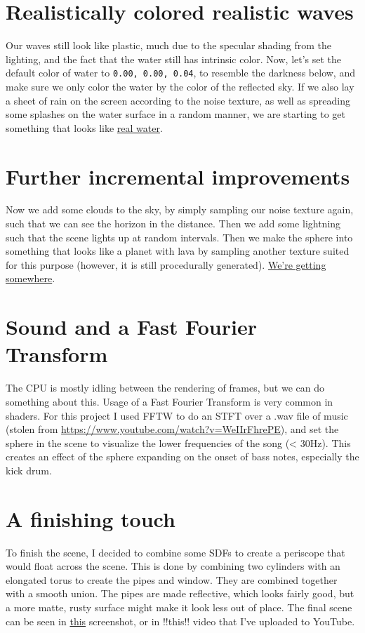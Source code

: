 \documentclass[abstract=off,oneside]{scrreprt}
\begin{document}
\section*{Realistically colored realistic waves}
\label{sec-10}
\label{sec:realisticcolor}
Our waves still look like plastic, much due to the specular shading
from the lighting, and the fact that the water still has intrinsic
color. Now, let's set the default color of water to \verb~0.00, 0.00, 0.04~, to resemble the darkness below, and make sure we only color the
water by the color of the reflected sky. If we also lay a sheet of
rain on the screen according to the noise texture, as well as
spreading some splashes on the water surface in a random manner, we
are starting to get something that looks like \hyperref[fig:okwater]{real water}.

\section*{Further incremental improvements}
\label{sec-11}
\label{sec:furtherimprovements}
Now we add some clouds to the sky, by simply sampling our noise
texture again, such that we can see the horizon in the distance. Then
we add some lightning such that the scene lights up at random
intervals. Then we make the sphere into something that looks like a
planet with lava by sampling another texture suited for this purpose
(however, it is still procedurally generated). \hyperref[fig:improvements]{We're getting
somewhere}.

\section*{Sound and a Fast Fourier Transform}
\label{sec-12}
\label{sec:sound}
The CPU is mostly idling between the rendering of frames, but we can
do something about this. Usage of a Fast Fourier Transform is very
common in shaders. For this project I used FFTW to do an STFT over a
.wav file of music (stolen from
\url{https://www.youtube.com/watch?v=WeIIrFhrePE}), and set the sphere in
the scene to visualize the lower frequencies of the song (<
30Hz). This creates an effect of the sphere expanding on the onset of
bass notes, especially the kick drum.

\section*{A finishing touch}
\label{sec-13}
\label{sec:periscope}
To finish the scene, I decided to combine some SDFs to create a
periscope that would float across the scene. This is done by combining
two cylinders with an elongated torus to create the pipes and
window. They are combined together with a smooth union. The pipes are
made reflective, which looks fairly good, but a more matte, rusty
surface might make it look less out of place. The final scene can be
seen in \hyperref[fig:finalscene]{this} screenshot, or in !!this!! video that I've uploaded
to YouTube.
\end{document}
